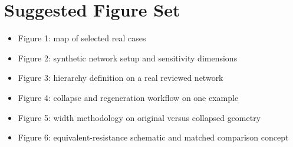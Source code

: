 \documentclass[11pt]{article}
\begin{document}
\section{Suggested Figure Set}
\begin{itemize}
\item Figure 1: map of selected real cases
\item Figure 2: synthetic network setup and sensitivity dimensions
\item Figure 3: hierarchy definition on a real reviewed network
\item Figure 4: collapse and regeneration workflow on one example
\item Figure 5: width methodology on original versus collapsed geometry
\item Figure 6: equivalent-resistance schematic and matched comparison concept
\end{itemize}
\end{document}

